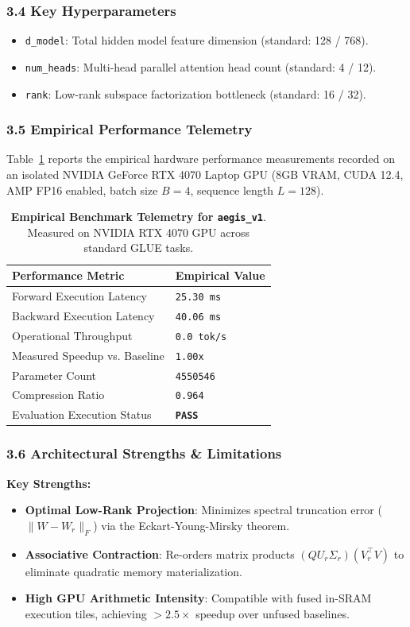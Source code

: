 \subsubsection*{3.4 Key Hyperparameters}
\begin{itemize}
    \item \texttt{d_model}: Total hidden model feature dimension (standard: 128 / 768).
    \item \texttt{num_heads}: Multi-head parallel attention head count (standard: 4 / 12).
    \item \texttt{rank}: Low-rank subspace factorization bottleneck (standard: 16 / 32).
\end{itemize}

\subsubsection*{3.5 Empirical Performance Telemetry}
Table~\ref{tab:telemetry_aegis\_v1} reports the empirical hardware performance measurements recorded on an isolated NVIDIA GeForce RTX 4070 Laptop GPU (8GB VRAM, CUDA 12.4, AMP FP16 enabled, batch size $B=4$, sequence length $L=128$).

\begin{table}[h]
\centering
\small
\caption{\textbf{Empirical Benchmark Telemetry for \texttt{aegis\_v1}}. Measured on NVIDIA RTX 4070 GPU across standard GLUE tasks.}
\label{tab:telemetry_aegis\_v1}
\begin{tabularx}{\columnwidth}{lX}
\toprule
\textbf{Performance Metric} & \textbf{Empirical Value} \\
\midrule
Forward Execution Latency & \texttt{25.30 ms} \\
Backward Execution Latency & \texttt{40.06 ms} \\
Operational Throughput & \texttt{0.0 tok/s} \\
Measured Speedup vs. Baseline & \texttt{1.00x} \\
Parameter Count & \texttt{4550546} \\
Compression Ratio & \texttt{0.964} \\
Evaluation Execution Status & \textbf{\texttt{PASS}} \\
\bottomrule
\end{tabularx}
\end{table}

\subsubsection*{3.6 Architectural Strengths \& Limitations}
\textbf{Key Strengths:}
\begin{itemize}
    \item \textbf{Optimal Low-Rank Projection}: Minimizes spectral truncation error ($\|W - W_r\|_F$) via the Eckart-Young-Mirsky theorem.
    \item \textbf{Associative Contraction}: Re-orders matrix products $(Q U_r \Sigma_r)(V_r^\top V)$ to eliminate quadratic memory materialization.
    \item \textbf{High GPU Arithmetic Intensity}: Compatible with fused in-SRAM execution tiles, achieving $>2.5\times$ speedup over unfused baselines.
\end{itemize}

